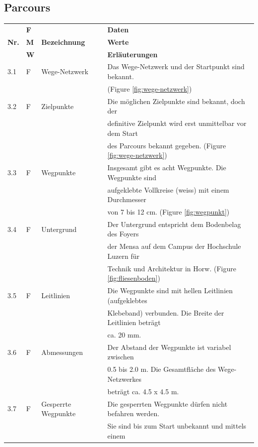 \documentclass[11pt, a4paper]{article}
\begin{document}
\subsection{Parcours}
    \begin{tabular}{|l|l|l|l|}
    \hline
    & \textbf{F} & & \textbf{Daten} \\
    \textbf{Nr.} & \textbf{M} & \textbf{Bezeichnung} & \textbf{Werte} \\
    & \textbf{W} & & \textbf{Erläuterungen} \\
    \hline
    3.1 & F & Wege-Netzwerk & Das Wege-Netzwerk und der Startpunkt sind bekannt. \\
    & & & (Figure \ref{fig:wege-netzwerk}) \\
    \hline
    3.2 & F & Zielpunkte & Die möglichen Zielpunkte sind bekannt, doch der \\
    & & & definitive Zielpunkt wird erst unmittelbar vor dem Start \\
    & & & des Parcours bekannt gegeben. (Figure \ref{fig:wege-netzwerk}) \\
    \hline
    3.3 & F & Wegpunkte & Insgesamt gibt es acht Wegpunkte. Die Wegpunkte sind \\
    & & & aufgeklebte Vollkreise (weiss) mit einem Durchmesser \\
    & & & von 7 bis 12 cm. (Figure \ref{fig:wegpunkt}) \\
    \hline
    3.4 & F & Untergrund & Der Untergrund entspricht dem Bodenbelag des Foyers \\
    & & & der Mensa auf dem Campus der Hochschule Luzern für \\
    & & & Technik und Architektur in Horw. (Figure \ref{fig:fliesenboden}) \\
    \hline
    3.5 & F & Leitlinien & Die Wegpunkte sind mit hellen Leitlinien (aufgeklebtes \\
    & & & Klebeband) verbunden. Die Breite der Leitlinien beträgt \\
    & & & ca. 20 mm. \\
    \hline
    3.6 & F & Abmessungen & Der Abstand der Wegpunkte ist variabel zwischen \\
    & & & 0.5 bis 2.0 m. Die Gesamtfläche des Wege-Netzwerkes \\
    & & & beträgt ca. 4.5 x 4.5 m. \\
    \hline
    3.7 & F &  Gesperrte Wegpunkte & Die gesperrten Wegpunkte dürfen nicht befahren werden. \\
    & & & Sie sind bis zum Start unbekannt und mittels einem \\

\end{tabular}
\end{document}

